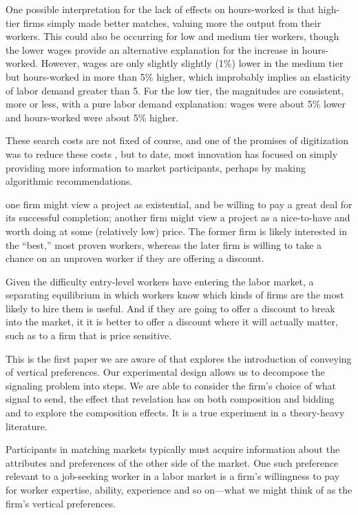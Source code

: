 One possible interpretation for the lack of effects on hours-worked is that high-tier firms simply made better matches, valuing more the output from their workers.
This could also be occurring for low and medium tier workers, though the lower wages provide an alternative explanation for the increase in hours-worked.
However, wages are only slightly slightly (1\%) lower in the medium tier but hours-worked in more than 5\% higher, which improbably implies an elasticity of labor demand greater than 5.
For the low tier, the magnitudes are consistent, more or less, with a pure labor demand explanation:
wages were about 5\% lower and hours-worked were about 5\% higher. 

These search costs are not fixed of course, and one of the promises of digitization was to reduce these costs \citep{kuhn2004internet,kuhn2014internet}, but to date, most innovation has focused on simply providing more information to market participants, perhaps by making algorithmic recommendations.


one firm might view a project as existential, and be willing to pay a great deal for its successful completion;
another firm might view a project as a nice-to-have and worth doing at some (relatively low) price. 
The former firm is likely interested in the ``best,'' most proven workers, whereas the later firm is willing to take a chance on an unproven worker if they are offering a discount.


Given the difficulty entry-level workers have entering the labor market, a separating equilibrium in which workers know which kinds of firms are the most likely to hire them is useful.
And if they are going to offer a discount to break into the market, it it is better to offer a discount where it will actually matter, such as to a firm that is price sensitive. 

This is the first paper we are aware of that explores the introduction of conveying of vertical preferences.
Our experimental design allows us to decompose the signaling problem into steps.
We are able to consider the firm's choice of what signal to send, the effect that revelation has on both composition and bidding and to explore the composition effects.
It is a true experiment in a theory-heavy literature.



Participants in matching markets typically must acquire information about the attributes and preferences of the other side of the market.
One such preference relevant to a job-seeking worker in a labor market is a firm's willingness to pay for worker expertise, ability, experience and so on---what we might think of as the firm's vertical preferences. 

